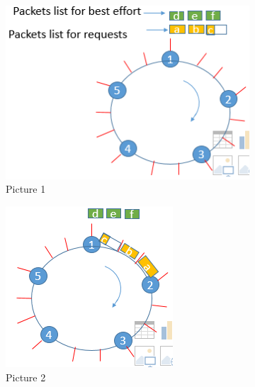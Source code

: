\documentclass{article}
\begin{document}
\begin{figure}
  \begin{subfigure}[b]{0.3\textwidth}
    \includegraphics[width=\textwidth]{model21.PNG}
    \caption{Picture 1}
    \label{fig:1}
  \end{subfigure}
  \begin{subfigure}[b]{0.3\textwidth}
    \includegraphics[width=\textwidth]{model22.PNG}
    \caption{Picture 2}
    \label{fig:2}
  \end{subfigure}
%
  \begin{subfigure}[b]{0.3\textwidth}

\end{subfigure}
\end{figure}
\end{document}
